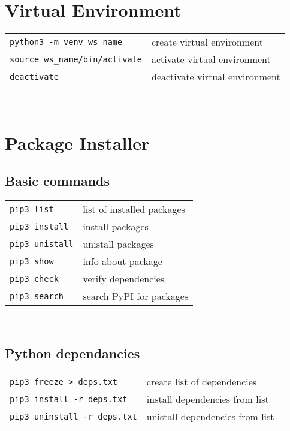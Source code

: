
\section{Virtual Environment}

    \begin{tabular}{@{}ll@{}}
        \verb!python3 -m venv ws_name!    & create virtual environment \\
        \verb!source ws_name/bin/activate!    & activate virtual environment \\
        \verb!deactivate!    & deactivate virtual environment \\
    \end{tabular} \\
        


\section{Package Installer}

    \subsection{Basic commands}

        \begin{tabular}{@{}ll@{}}
            \verb!pip3 list!    & list of installed packages \\
            \verb!pip3 install!    & install packages \\
            \verb!pip3 unistall!    & unistall packages \\
            \verb!pip3 show!    & info about package \\
            \verb!pip3 check!    & verify dependencies \\
            \verb!pip3 search!    & search PyPI for packages \\
        \end{tabular} \\
    
    \subsection{Python dependancies}
    
        \begin{tabular}{@{}ll@{}}
            \verb!pip3 freeze > deps.txt!    & create list of dependencies \\
            \verb!pip3 install -r deps.txt!    & install dependencies from list \\
            \verb!pip3 uninstall -r deps.txt!    & unistall dependencies from list \\
        \end{tabular} \\

